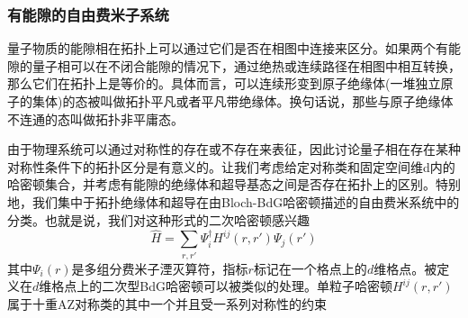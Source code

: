 \documentclass{article}
\numberwithin{equation}{subsection}
\begin{document}
\subsubsection{有能隙的自由费米子系统}
量子物质的能隙相在拓扑上可以通过它们是否在相图中连接来区分。如果两个有能隙的量子相可以在不闭合能隙的情况下，通过绝热或连续路径在相图中相互转换，那么它们在拓扑上是等价的。具体而言，可以连续形变到原子绝缘体(一堆独立原子的集体)的态被叫做拓扑平凡或者平凡带绝缘体。换句话说，那些与原子绝缘体不连通的态叫做拓扑非平庸态。

由于物理系统可以通过对称性的存在或不存在来表征，因此讨论量子相在存在某种对称性条件下的拓扑区分是有意义的。让我们考虑给定对称类和固定空间维d内的哈密顿集合，并考虑有能隙的绝缘体和超导基态之间是否存在拓扑上的区别。特别地，我们集中于拓扑绝缘体和超导在由Bloch-BdG哈密顿描述的自由费米系统中的分类。也就是说，我们对这种形式的二次哈密顿感兴趣
\begin{equation}
    \hat{H}=\sum_{r,r'}\Psi_i^\dagger H^{ij}(r,r')\Psi_j(r')
\end{equation}
其中$\Psi_i(r)$是多组分费米子湮灭算符，指标$r$标记在一个格点上的$d$维格点。被定义在$d$维格点上的二次型BdG哈密顿可以被类似的处理。单粒子哈密顿$H^{ij}(r,r')$属于十重AZ对称类的其中一个并且受一系列对称性的约束
\end{document}
